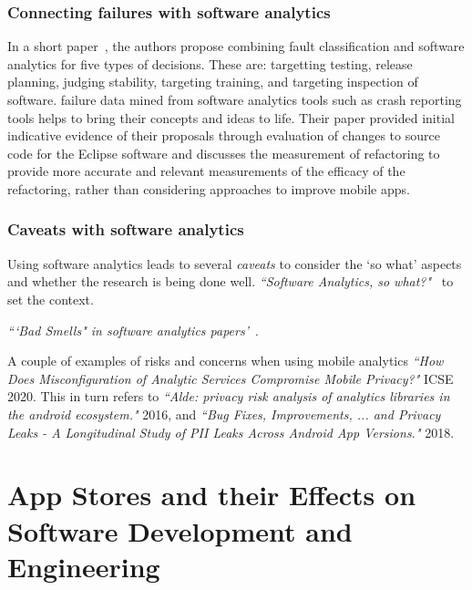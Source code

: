 \subsubsection{Connecting failures with software analytics}
In a short paper~, the authors propose combining fault classification and software analytics for five types of decisions. These are: targetting testing, release planning, judging stability, targeting training, and targeting inspection of software. failure data mined from software analytics tools such as crash reporting tools helps to bring their concepts and ideas to life. Their paper provided initial indicative evidence of their proposals through evaluation of changes to source code for the Eclipse software and discusses the measurement of refactoring to provide more accurate and relevant measurements of the efficacy of the refactoring, rather than considering approaches to improve mobile apps.

\subsubsection{Caveats with software analytics}
Using software analytics leads to several \textit{caveats} to consider the `so what' aspects and whether the research is being done well. 
\emph{``Software Analytics, so what?"}~\cite{menzies2013_software_analytics_so_what} to set the context.

\emph{```Bad Smells" in software analytics papers'}~.

A couple of examples of risks and concerns when using mobile analytics 
\emph{``How Does Misconfiguration of Analytic Services Compromise Mobile Privacy?"} ICSE 2020. This in turn refers to \emph{``Alde: privacy risk analysis of analytics libraries in the android ecosystem."} 2016, and \emph{``Bug Fixes, Improvements, ... and Privacy Leaks - A Longitudinal Study of PII Leaks Across Android App Versions."} 2018.


\section{App Stores and their Effects on Software Development and Engineering}~\label{rw-app-stores-and-their-effects-on-software-development-and-engineering}

